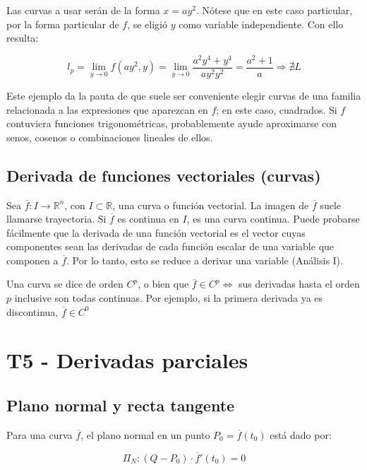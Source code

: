 \documentclass{article}
\renewcommand{\Bbb}{\mathbb}
\begin{document}
Las curvas a usar serán de la forma $x = a y^2$. Nótese que en este caso particular, por la forma particular de $f$, se eligió $y$ como variable independiente. Con ello resulta:

\begin{equation}
l_p = \lim_{y \rightarrow 0} f(ay^2, y) = \lim_{y \rightarrow 0} \frac{a^2 y^4 + y^4}{ay^2y^2} = \frac{a^2 + 1}{a} \Rightarrow \nexists L
\end{equation}

Este ejemplo da la pauta de que suele ser conveniente elegir curvas de una familia relacionada a las expresiones que aparezcan en $f$; en este caso, cuadrados. Si $f$ contuviera funciones trigonométricas, probablemente ayude aproximarse con senos, cosenos o combinaciones lineales de ellos.

\subsection{Derivada de funciones vectoriales (curvas)}

Sea $\overline{f}:I \rightarrow \Bbb R^n$, con $I \subset \Bbb R$, una curva o función vectorial. La imagen de $\overline{f}$ suele llamarse trayectoria. Si $\overline{f}$ es continua en $I$, es una curva continua. Puede probarse fácilmente que la derivada de una función vectorial es el vector cuyas componentes sean las derivadas de cada función escalar de una variable que componen a $\overline{f}$. Por lo tanto, esto se reduce a derivar una variable (Análisis I).

Una curva se dice de orden $C^p$, o bien que $\overline{f} \in C^p \Longleftrightarrow$ sus derivadas hasta el orden $p$ inclusive son todas continuas. Por ejemplo, si la primera derivada ya es discontinua, $\overline{f} \in C^0$

\section{T5 - Derivadas parciales}

\subsection{Plano normal y recta tangente}

Para una curva $\overline{f}$, el plano normal en un punto $P_0 = \overline{f}(t_0)$ está dado por:

\begin{equation}
\Pi_N : (Q - P_0) \cdot \overline{f}'(t_0) = 0
\end{equation}
\end{document}
